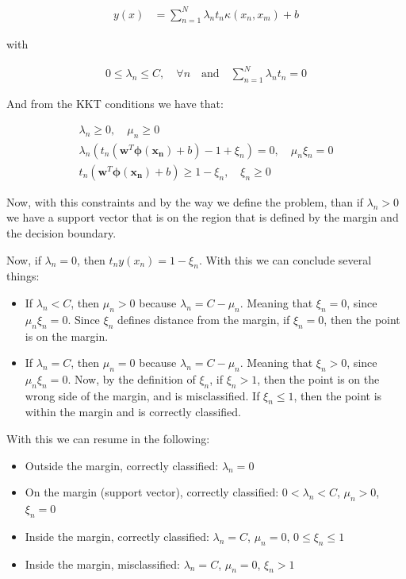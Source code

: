 \documentclass[12pt,a4paper,oneside]{paper}
\begin{document}
\begin{align*}
    y(x) &= \sum_{n=1}^{N} \lambda_n t_n \kappa (x_n, x_m) + b
\end{align*}

with 

\begin{align*}
    0 \leq \lambda_n \leq C, \quad \forall n \quad \text{and} \quad \sum_{n=1}^{N} \lambda_n t_n = 0
\end{align*}

And from the KKT conditions we have that:

\begin{align*}
    \lambda_n \geq 0, \quad \mu_n \geq 0 \\
    \lambda_n \left( t_n (\bm{w}^T \bm{\phi(x_n)} + b) - 1 + \xi_n \right) = 0, \quad \mu_n \xi_n = 0 \\
    t_n (\bm{w}^T \bm{\phi(x_n)} + b) \geq 1 - \xi_n, \quad \xi_n \geq 0
\end{align*}

Now, with this constraints and by the way we define the problem, than
if $\lambda_n > 0$ we have a support vector that is on the region that is defined by the margin and the decision boundary.

Now, if $\lambda_n = 0$, then $t_n y(x_n) = 1 - \xi_n$. With this we can conclude several things:

\begin{itemize}
    \item If $\lambda_n < C$, then $\mu_n > 0$ because $\lambda_n = C - \mu_n$. Meaning that $\xi_n = 0$, since $\mu_n \xi_n = 0$.
Since $\xi_n$ defines distance from the margin, if $\xi_n = 0$, then the point is on the margin.
    \item If $\lambda_n = C$, then $\mu_n = 0$ because $\lambda_n = C - \mu_n$. Meaning that $\xi_n > 0$, since $\mu_n \xi_n = 0$.
Now, by the definition of $\xi_n$, if $\xi_n > 1$, then the point is on the wrong side of the margin, and is misclassified.
If $\xi_n \leq 1$, then the point is within the margin and is correctly classified.
\end{itemize}

With this we can resume in the following:

\begin{itemize}
    \item Outside the margin, correctly classified: $\lambda_n = 0$
    \item On the margin (support vector), correctly classified: $0 < \lambda_n < C$, $\mu_n > 0$, $\xi_n = 0$
    \item Inside the margin, correctly classified: $\lambda_n = C$, $\mu_n = 0$, $0 \leq \xi_n \leq 1$
    \item Inside the margin, misclassified: $\lambda_n = C$, $\mu_n = 0$, $\xi_n > 1$
\end{itemize}
\end{document}
